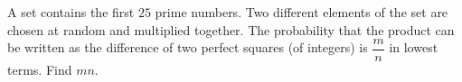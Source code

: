 A set contains the first $25$ prime numbers. Two different elements of the set are chosen at random and multiplied together. The probability that the product can be written as the difference of two perfect squares (of integers) is $\dfrac mn$ in lowest terms. Find $mn$.
